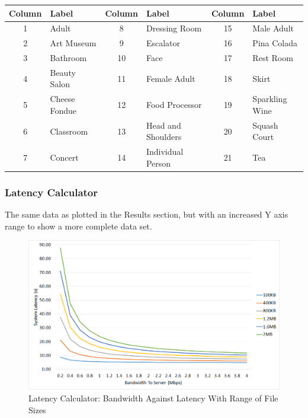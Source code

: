 \documentclass{article}
\begin{document}
\begin{landscape}
\begin{table}
\centering
\begin{tabularx}{\textheight}{|c| X |c |X |c |l |}
\hline
Column &  Label & Column & Label & Column & Label\\
\hline
1&Adult& 8 &Dressing Room & 15&Male Adult \\
2&Art Museum & 9 &Escalator & 16 & Pina Colada\\
3&Bathroom &10&Face&17&Rest Room \\
4&Beauty Salon &11&Female Adult &18&Skirt\\
5&Cheese Fondue &12&Food Processor & 19&Sparkling Wine\\
6&Classroom &13&Head and Shoulders & 20&Squash Court\\
7&Concert &14&Individual Person&21&Tea\\
\hline
\end{tabularx}
\end{table}
\end{landscape}

\subsubsection{Latency Calculator}
The same data as plotted in the Results section, but with an increased Y axis range to show a more complete data set.  
\begin{figure}[h]
\caption{Latency Calculator: Bandwidth Against Latency With Range of File Sizes\label{fig:LatencyVsBandwidthMaxAxis}}
\includegraphics[width=\textwidth]{LatencyVsBandwidthMaxAxis}
\end{figure}
\end{document}

